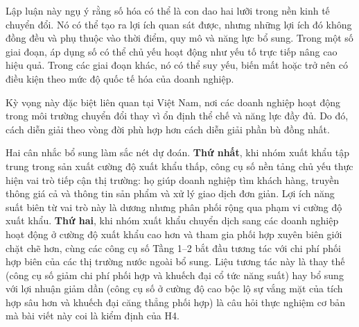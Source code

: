 \documentclass[12pt,a4paper]{article}
\begin{document}
Lập luận này ngụ ý rằng số hóa có thể là con dao hai lưỡi trong nền kinh
tế chuyển đổi. Nó có thể tạo ra lợi ích quan sát được, nhưng những lợi
ích đó không đồng đều và phụ thuộc vào thời điểm, quy mô và năng lực bổ
sung. Trong một số giai đoạn, áp dụng số có thể chủ yếu hoạt động như
yếu tố trực tiếp nâng cao hiệu quả. Trong các giai đoạn khác, nó có thể
suy yếu, biến mất hoặc trở nên có điều kiện theo mức độ quốc tế hóa của
doanh nghiệp.

Kỳ vọng này đặc biệt liên quan tại Việt Nam, nơi các doanh nghiệp hoạt
động trong môi trường chuyển đổi thay vì ổn định thể chế và năng lực đầy
đủ. Do đó, cách diễn giải theo vòng đời phù hợp hơn cách diễn giải phần
bù đồng nhất.

Hai cân nhắc bổ sung làm sắc nét dự đoán. \textbf{Thứ nhất}, khi nhóm
xuất khẩu tập trung trong sản xuất cường độ xuất khẩu thấp, công cụ số
nền tảng chủ yếu thực hiện vai trò tiếp cận thị trường: họ giúp doanh
nghiệp tìm khách hàng, truyền thông giá cả và thông tin sản phẩm và xử
lý giao dịch đơn giản. Lợi ích năng suất biên từ vai trò này là dương
nhưng phân phối rộng qua phạm vi cường độ xuất khẩu. \textbf{Thứ hai},
khi nhóm xuất khẩu chuyển dịch sang các doanh nghiệp hoạt động ở cường
độ xuất khẩu cao hơn và tham gia phối hợp xuyên biên giới chặt chẽ hơn,
cùng các công cụ số Tầng 1--2 bắt đầu tương tác với chi phí phối hợp
biên của các thị trường nước ngoài bổ sung. Liệu tương tác này là thay
thế (công cụ số giảm chi phí phối hợp và khuếch đại cổ tức năng suất)
hay bổ sung với lợi nhuận giảm dần (công cụ số ở cường độ cao bộc lộ sự
vắng mặt của tích hợp sâu hơn và khuếch đại căng thẳng phối hợp) là câu
hỏi thực nghiệm cơ bản mà bài viết này coi là kiểm định của H4.
\end{document}
